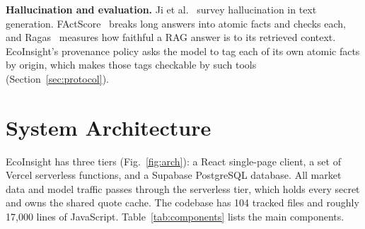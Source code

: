 \documentclass[conference]{IEEEtran}
\begin{document}
\textbf{Hallucination and evaluation.} Ji et al.~\cite{ji2023survey} survey hallucination in text generation. FActScore~\cite{min2023factscore} breaks long answers into atomic facts and checks each, and Ragas~\cite{es2023ragas} measures how faithful a RAG answer is to its retrieved context. EcoInsight's provenance policy asks the model to tag each of its own atomic facts by origin, which makes those tags checkable by such tools (Section~\ref{sec:protocol}).

\section{System Architecture}

EcoInsight has three tiers (Fig.~\ref{fig:arch}): a React single-page client, a set of Vercel serverless functions, and a Supabase PostgreSQL database. All market data and model traffic passes through the serverless tier, which holds every secret and owns the shared quote cache. The codebase has 104 tracked files and roughly 17{,}000 lines of JavaScript. Table~\ref{tab:components} lists the main components.
\end{document}
